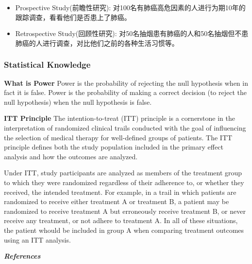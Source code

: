 \documentclass[
]{ctexart}
\providecommand{\tightlist}{%
  \setlength{\itemsep}{0pt}\setlength{\parskip}{0pt}}
\begin{document}
\begin{itemize}
\tightlist
\item
  Prospective Study(前瞻性研究):
  对100名有肺癌高危因素的人进行为期10年的跟踪调查，看看他们是否患上了肺癌。
\item
  Retrospective Study(回顾性研究):
  对50名抽烟患有肺癌的人和50名抽烟但不患肺癌的人进行调查，对比他们之前的各种生活习惯等。
\end{itemize}

\hypertarget{statistical-knowledge}{%
\subsubsection{\texorpdfstring{\textbf{Statistical
Knowledge}}{Statistical Knowledge}}\label{statistical-knowledge}}

\textbf{What is Power} Power is the probability of rejecting the null
hypothesis when in fact it is false. Power is the probability of making
a correct decision (to reject the null hypothesis) when the null
hypothesis is false.

\textbf{ITT Principle} The intention-to-treat (ITT) principle is a
cornerstone in the interpretation of randomized clinical trails
conducted with the goal of influencing the selection of medical therapy
for well-defined groups of patients. The ITT principle defines both the
study population included in the primary effect analysis and how the
outcomes are analyzed.

Under ITT, study participants are analyzed as members of the treatment
group to which they were randomized regardless of their adherence to, or
whether they received, the intended treatment. For example, in a trail
in which patients are randomized to receive either treatment A or
treatment B, a patient may be randomized to receive treatment A but
erroneously receive treatment B, or never receive any treatment, or not
adhere to treatment A. In all of these situations, the patient whould be
included in group A when comparing treatment outcomes using an ITT
analysis.

\textbf{\emph{References}}
\end{document}
